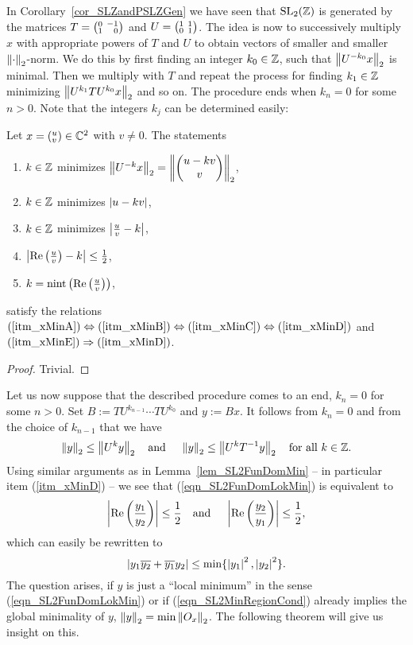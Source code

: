 In Corollary~\ref{cor_SLZandPSLZGen} we have seen that $\SL{\Z}$ is generated by the matrices $T = \smallmat{0}{-1}{1}{\phantom{-}0}$ and $U = \smallmat{1}{1}{0}{1}$. The idea is now to successively multiply $x$ with appropriate powers of $T$ and $U$ to obtain vectors of smaller and smaller $\eucnorm{\cdot}$-norm. We do this by first finding an integer $k_0 \in \Z$, such that $\eucnorm{U^{-k_0}x}$ is minimal. Then we multiply with $T$ and repeat the process for finding $k_1 \in \Z$ minimizing $\eucnorm{U^{k_1} T U^{k_0} x}$ and so on. The procedure ends when $k_n = 0$ for some $n>0$. Note that the integers $k_j$ can be determined easily:
\begin{lemma}
\label{lem_SL2FunDomMin}
Let $x = ({}^u_v)\in \C^2$ with $v \ne 0$. The statements
\begin{enumerate}[\qquad(i)]
\item \label{itm_xMinA}
$k \in \Z$ minimizes $\eucnorm{U^{-k}x} = \eucnorm{\cvec{u - k v}{v}}$,
\item \label{itm_xMinB} $k \in \Z$ minimizes $\abs{u - k v}$,
\item \label{itm_xMinC} $k \in \Z$ minimizes $\abs{\frac{u}{v} - k}$,
\item \label{itm_xMinD} $\abs{\Re{\frac{u}{v}} - k} \le \reci{2}$,
\item \label{itm_xMinE} $k = \nint{\Re{\frac{u}{v}}}$,
\end{enumerate}
satisfy the relations $(\ref{itm_xMinA}) \Leftrightarrow (\ref{itm_xMinB}) \Leftrightarrow (\ref{itm_xMinC}) \Leftrightarrow (\ref{itm_xMinD})$ and $(\ref{itm_xMinE}) \Rightarrow (\ref{itm_xMinD})$.
\end{lemma}
\begin{proof}
Trivial.
\end{proof}
Let us now suppose that the described procedure comes to an end, \ie $k_n = 0$ for some $n > 0$. Set $B  := TU^{k_{n-1}} \cdots TU^{k_0}$ and $y :=  Bx$. It follows from $k_n = 0$ and from the choice of $k_{n-1}$ that we have 
\begin{equation}
\label{eqn_SL2FunDomLokMin}
\eucnorm{y} \le \eucnorm{U^k y} \text{\quad and \quad} \eucnorm{y} \le \eucnorm{U^k \inv{T} y} \text{\quad for all } k \in \Z.
\end{equation}
Using similar arguments as in Lemma~\ref{lem_SL2FunDomMin} -- in particular item (\ref{itm_xMinD}) -- we see that (\ref{eqn_SL2FunDomLokMin}) is equivalent to
\begin{equation*}
\abs{\Re{\frac{y_1}{y_2}}} \le \reci{2} \text{\quad and \quad} \abs{\Re{\frac{y_2}{y_1}}} \le \reci{2},
\end{equation*}
which can easily be rewritten to
\begin{equation}
\label{eqn_SL2MinRegionCond}
\abs{y_1 \conj{y_2} + \conj{y_1} y_2} \le \min\{\abs{y_1}^2, \abs{y_2}^2\}.
\end{equation}
The question arises, if $y$ is just a ``local minimum'' in the sense (\ref{eqn_SL2FunDomLokMin}) or if (\ref{eqn_SL2MinRegionCond}) already implies the global minimality of $y$, \ie $\eucnorm{y} = \min \eucnorm{O_x}$. The following theorem will give us insight on this.

